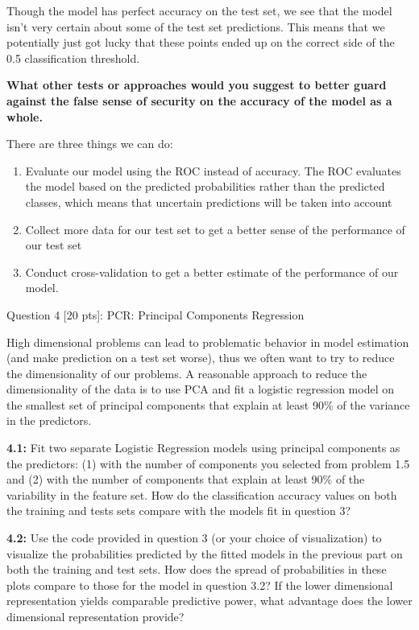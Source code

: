 \documentclass[11pt]{article}
\begin{document}
Though the model has perfect accuracy on the test set, we see that the
model isn't very certain about some of the test set predictions. This
means that we potentially just got lucky that these points ended up on
the correct side of the 0.5 classification threshold.

\textbf{What other tests or approaches would you suggest to better guard
against the false sense of security on the accuracy of the model as a
whole.}

There are three things we can do:

\begin{enumerate}
\def\labelenumi{\arabic{enumi})}
\item
  Evaluate our model using the ROC instead of accuracy. The ROC
  evaluates the model based on the predicted probabilities rather than
  the predicted classes, which means that uncertain predictions will be
  taken into account
\item
  Collect more data for our test set to get a better sense of the
  performance of our test set
\item
  Conduct cross-validation to get a better estimate of the performance
  of our model.
\end{enumerate}

     Question 4 {[}20 pts{]}: PCR: Principal Components Regression

High dimensional problems can lead to problematic behavior in model
estimation (and make prediction on a test set worse), thus we often want
to try to reduce the dimensionality of our problems. A reasonable
approach to reduce the dimensionality of the data is to use PCA and fit
a logistic regression model on the smallest set of principal components
that explain at least 90\% of the variance in the predictors.

\textbf{4.1:} Fit two separate Logistic Regression models using
principal components as the predictors: (1) with the number of
components you selected from problem 1.5 and (2) with the number of
components that explain at least 90\% of the variability in the feature
set. How do the classification accuracy values on both the training and
tests sets compare with the models fit in question 3?

\textbf{4.2:} Use the code provided in question 3 (or your choice of
visualization) to visualize the probabilities predicted by the fitted
models in the previous part on both the training and test sets. How does
the spread of probabilities in these plots compare to those for the
model in question 3.2? If the lower dimensional representation yields
comparable predictive power, what advantage does the lower dimensional
representation provide?
\end{document}
